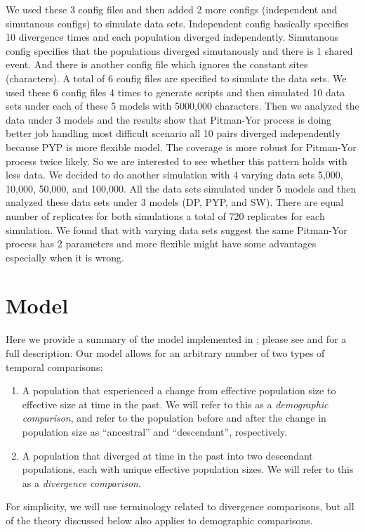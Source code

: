 \documentclass[letterpaper,12pt]{article}
\begin{document}
We used these 3 config files and then added 2 more configs (independent and simutanous configs) to simulate data sets. Independent config 
basically specifies 10 divergence times and each population diverged independently. Simutanous config specifies that the populations 
diverged simutanously and there is 1 shared event. And there is another config file which ignores the constant sites (characters). A total of 6 config 
files are specified to simulate the data sets. We used these 6 config files 4 times to generate scripts and then simulated 10 data sets under each of 
these 5 models with 5000,000 characters. Then we analyzed the data under 3 models and the results show that Pitman-Yor process is doing better job handling 
most difficult scenario all 10 pairs diverged independently because PYP is more flexible model. The coverage is more robust for Pitman-Yor process twice likely.
So we are interested to see whether this pattern holds with less data. We decided to do another simulation with 4 varying data sets 5,000, 10,000, 50,000, and 100,000. 
All the data sets simulated under 5 models and then analyzed these data sets under 3 models (DP, PYP, and SW). There are equal number of replicates for both simulations 
a total of 720 replicates for each simulation. We found that with varying data sets suggest the same Pitman-Yor process has 2 parameters and more flexible might 
have some advantages especially when it is wrong.

\section{Model}

Here we provide a summary of the model implemented in \ecoevolity; please see
\citet{Oaks2018ecoevolity} and \citet{Oaks2019codemog} for a full description.
Our model allows for an arbitrary number of two types of temporal comparisons:
\begin{enumerate}
    \item A population that experienced a change from effective population size
        \epopsize[\rootpopindex]
        to effective size
        \epopsize[\descendantpopindex{}]
        at time \comparisonetime in the past.
        We will refer to this as a \emph{demographic comparison},
        and refer to the population before and after the change in population
        size as ``ancestral'' and ``descendant'', respectively.
    \item A population that diverged at time \comparisonetime in the past into
        two descendant populations, each with unique effective population
        sizes.
        We will refer to this as a \emph{divergence comparison}.
\end{enumerate}
For simplicity, we will use terminology related to divergence comparisons, but
all of the theory discussed below also applies to demographic comparisons.
\end{document}
